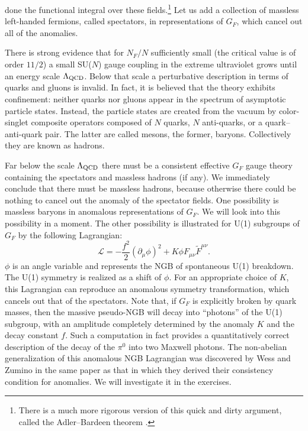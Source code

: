 done the functional integral over these fields.\footnote[20]{There is a much
more rigorous version of this quick and dirty argument, called the
Adler--Bardeen theorem \cite{banks-ref-105}.} Let us add a collection of massless
left-handed fermions, called spectators, in representations of $G_F$, which
cancel out all of the anomalies.

There is strong evidence that for $N_F/N$ sufficiently small (the critical
value is of order $11/2$) a small SU($N$) gauge coupling in the extreme
ultraviolet grows until an energy scale $\Lambda_{\rm QCD}$. Below that scale
a perturbative description in terms of quarks and gluons is invalid. In fact,
it is believed that the theory exhibits confinement: neither quarks nor gluons
appear in the spectrum of asymptotic particle states. Instead, the particle
states are created from the vacuum by color-singlet composite operators
composed of $N$ quarks, $N$ anti-quarks, or a quark--anti-quark pair. The latter
are called mesons, the former, baryons. Collectively they are known as
hadrons.

Far below the scale $\Lambda_{\rm QCD}$ there must be a consistent effective
$G_F$ gauge theory containing the spectators and massless hadrons (if any).
We immediately conclude that there must be massless hadrons, because
otherwise there could be nothing to cancel out the anomaly of the spectator
fields. One possibility is massless baryons in anomalous representations of
$G_F$. We will look into this possibility in a moment. The other possibility
is illustrated for U(1) subgroups of $G_F$ by the following Lagrangian:
\[
  \mathcal L=-\frac{f^2}{2}(\partial_\mu\phi)^2
  +K\phi F_{\mu\nu}\widetilde F^{\mu\nu} .
\]
$\phi$ is an angle variable and represents the NGB of spontaneous U(1)
breakdown. The U(1) symmetry is realized as a shift of $\phi$. For an
appropriate choice of $K$, this Lagrangian can reproduce an anomalous
symmetry transformation, which cancels out that of the spectators. Note that,
if $G_F$ is explicitly broken by quark masses, then the massive pseudo-NGB
will decay into ``photons'' of the U(1) subgroup, with an amplitude completely
determined by the anomaly $K$ and the decay constant $f$. Such a computation
in fact provides a quantitatively correct description of the decay of the
$\pi^0$ into two Maxwell photons. The non-abelian generalization of this
anomalous NGB Lagrangian was discovered by Wess and Zumino in the same paper
\cite{banks-ref-106} as that in which they derived their consistency condition for anomalies.
We will investigate it in the exercises.

